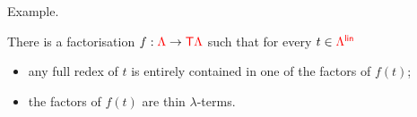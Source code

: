 Example.


\begin{proposition}
There is a factorisation $f:{\color{red}{\Lambda}} \to {\color{red}{\mathsf T}}{\color{red}{\Lambda}}$ such that for every $t\in{\color{red}{\Lambda^{\sf{lin}}}}$
\begin{itemize}
\item any full redex of $t$ is entirely contained in one of the factors of $f(t)$;
\item the factors of $f(t)$ are thin $\lambda$-terms.
\end{itemize}
\end{proposition}